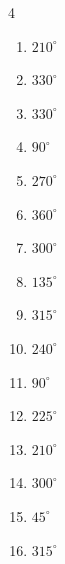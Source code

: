 \begin{multicols}{4}
\begin{enumerate}
  \item $\displaystyle 210^{\circ}$

  \item $\displaystyle 330^{\circ}$

  \item $\displaystyle 330^{\circ}$

  \item $\displaystyle 90^{\circ}$

  \item $\displaystyle 270^{\circ}$

  \item $\displaystyle 360^{\circ}$
        \phantom{$\displaystyle =2\pi$}

  \item $\displaystyle 300^{\circ}$

\columnbreak %

  \item $\displaystyle 135^{\circ}$

  \item $\displaystyle 315^{\circ}$

  \item $\displaystyle 240^{\circ}$

  \item $\displaystyle 90^{\circ}$

  \item $\displaystyle 225^{\circ}$

  \item $\displaystyle 210^{\circ}$

  \item $\displaystyle 300^{\circ}$

  \item $\displaystyle 45^{\circ}$

  \item $\displaystyle 315^{\circ}$


\end{enumerate}
\end{multicols}
